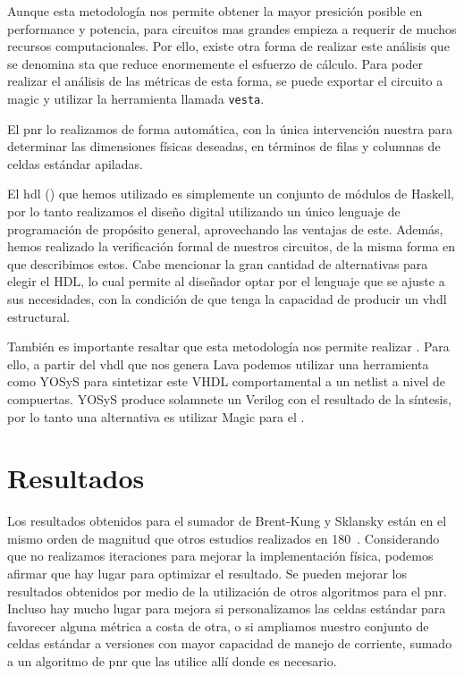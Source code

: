 Aunque esta metodología nos permite obtener la mayor presición posible en performance y potencia, para circuitos mas grandes empieza a requerir de muchos recursos computacionales. Por ello, existe otra forma de realizar este análisis que se denomina \gls{sta} que reduce enormemente el esfuerzo de cálculo. Para poder realizar el análisis de las métricas de esta forma, se puede exportar el circuito a magic y utilizar la herramienta llamada \verb.vesta.. 

El \gls{pnr} lo realizamos de forma automática, con la única intervención nuestra para determinar las dimensiones físicas deseadas, en términos de filas y columnas de celdas estándar apiladas.

El \gls{hdl} () que hemos utilizado es simplemente un conjunto de módulos de Haskell, por lo tanto realizamos el diseño digital utilizando un único lenguaje de programación de propósito general, aprovechando las ventajas de este. Además, hemos realizado la verificación formal de nuestros circuitos, de la misma forma en que describimos estos. Cabe mencionar la gran cantidad de alternativas para elegir el HDL, lo cual permite al diseñador optar por el lenguaje que se ajuste a sus necesidades, con la condición de que tenga la capacidad de producir un  \gls{vhdl} estructural.

También es importante resaltar que esta metodología nos permite realizar . Para ello, a partir del \gls{vhdl} que nos genera Lava podemos utilizar una herramienta como YOSyS\cite{Yosys} para sintetizar este VHDL comportamental a un netlist a nivel de compuertas. YOSyS produce solamnete un  Verilog con el resultado de la síntesis, por lo tanto una alternativa es utilizar Magic para el \layout.

\section{Resultados}
Los resultados obtenidos para el sumador de Brent-Kung y Sklansky están en el mismo orden de magnitud que otros estudios\cite{ramanathan,Chatterjee} realizados en 180~\nanom. Considerando que no realizamos iteraciones para mejorar la implementación física, podemos afirmar que hay lugar para optimizar el resultado. Se pueden mejorar los resultados obtenidos por medio de la utilización de otros algoritmos para el \gls{pnr}. Incluso hay mucho lugar para mejora si personalizamos las celdas estándar para favorecer alguna métrica a costa de otra, o si ampliamos nuestro conjunto de celdas estándar a versiones con mayor capacidad de manejo de corriente, sumado a un algoritmo de \gls{pnr} que las utilice allí donde es necesario.


